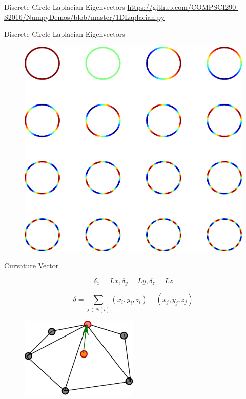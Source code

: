 \documentclass{beamer}
\begin{document}
\begin{frame}{Discrete Circle Laplacian Eigenvectors}
\tiny \url{https://github.com/COMPSCI290-S2016/NumpyDemos/blob/master/1DLaplacian.py}
\end{frame}

\begin{frame}{Discrete Circle Laplacian Eigenvectors}

\begin{figure}[t]
    \includegraphics[width=\textwidth]{CircleFunctions.png}
\end{figure}

\end{frame}

\begin{frame}{Curvature Vector}

\[ \delta_x = Lx, \delta_y = Ly, \delta_z = Lz \]

\[ \delta = \sum_{j \in N(i)} (x_i, y_i, z_i) - (x_j, y_j, z_j) \]

\begin{figure}[t]
    \includegraphics[width=0.5\textwidth]{2DDiscreteCurvature.pdf}
\end{figure}


\end{frame}
\end{document}
